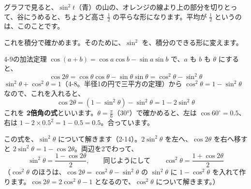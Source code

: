 \noindent\begin{minipage}[c]{0.5\linewidth}
\end{minipage}\hfill
\begin{minipage}[c]{0.46\linewidth}
グラフで見ると、$\sin^2t$（青）の山の、オレンジの線より上の部分を切りとって、谷にうめると、ちょうど高さ $\frac{1}{2}$ の平らな形になります。平均が $\frac{1}{2}$ というのは、このことです。
\end{minipage}\par\vspace{4pt}
これを積分で確かめます。そのために、$\sin^2$ を、積分のできる形に変えます。

4-9の加法定理 $\cos(a+b)=\cos a\cos b-\sin a\sin b$ で、$a$ も $b$ も $\theta$ にすると、
\[ \cos2\theta=\cos\theta\cos\theta-\sin\theta\sin\theta=\cos^2\theta-\sin^2\theta \]
$\sin^2\theta+\cos^2\theta=1$（4-8。半径1の円で三平方の定理）から $\cos^2\theta=1-\sin^2\theta$ なので、これを入れると、
\[ \cos2\theta=(1-\sin^2\theta)-\sin^2\theta=1-2\sin^2\theta \]
これを \textbf{2倍角の式}といいます。$\theta=\frac{\pi}{6}$（30°）で確かめると、左は $\cos60^\circ=0.5$、右は $1-2\times0.5^2=1-0.5=0.5$。合っています。

この式を、$\sin^2\theta$ について解きます（2-14）。$2\sin^2\theta$ を左へ、$\cos2\theta$ を右へ移すと $2\sin^2\theta=1-\cos2\theta$。両辺を2でわって、
\[ \sin^2\theta=\frac{1-\cos2\theta}{2},\qquad\text{同じようにして}\qquad \cos^2\theta=\frac{1+\cos2\theta}{2} \]
（$\cos^2\theta$ のほうは、$\cos2\theta=\cos^2\theta-\sin^2\theta$ の $\sin^2\theta$ に $1-\cos^2\theta$ を入れて作ります。$\cos2\theta=2\cos^2\theta-1$ となるので、$\cos^2\theta$ について解きます。）

